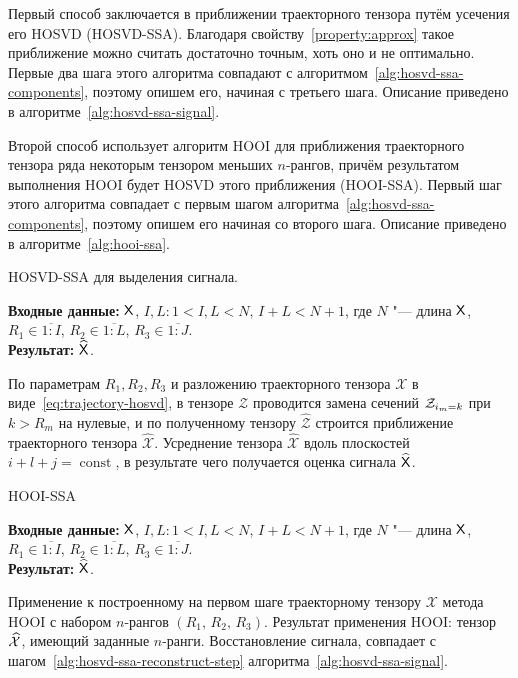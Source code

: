 \documentclass[specialist,
  substylefile=spbu.rtx,
subf,href,colorlinks=true, 12pt]{disser}
\theoremstyle{plain}
\theoremstyle{definition}
\theoremstyle{remark}
\newcommand{\Input}{\textbf{Входные данные: }}
\newcommand{\Output}{\textbf{Результат: }}
\begin{document}
Первый способ заключается в приближении траекторного тензора путём усечения его HOSVD (HOSVD-SSA).
Благодаря свойству~\ref{property:approx} такое приближение можно считать достаточно точным,
хоть оно и не оптимально.
Первые два шага этого алгоритма совпадают с алгоритмом~\ref{alg:hosvd-ssa-components}, поэтому опишем его, начиная с третьего шага.
Описание приведено в алгоритме~\ref{alg:hosvd-ssa-signal}.

Второй способ использует алгоритм HOOI для приближения траекторного тензора ряда некоторым тензором
меньших $n$-рангов, причём результатом выполнения HOOI будет HOSVD этого приближения (HOOI-SSA).
Первый шаг этого алгоритма совпадает с первым шагом алгоритма~\ref{alg:hosvd-ssa-components},
поэтому опишем его начиная со второго шага.
Описание приведено в алгоритме~\ref{alg:hooi-ssa}.

\begin{algorithm}[!ht]
  \caption{HOSVD-SSA для выделения сигнала.}
  \label{alg:hosvd-ssa-signal}
  \Input $\mathsf{X}$, $I,L: 1< I,L < N,\, I + L < N + 1$, где $N$ "--- длина $\mathsf{X}$, $R_1 \in \overline{1:I}$,
  $R_2 \in \overline{1:L}$, $R_3 \in \overline{1:J}$.\\
  \Output $\widehat{\mathsf{X}}$.

  \begin{algorithmic}[1]
    \State По параметрам $R_1, R_2, R_3$ и разложению траекторного тензора $\mathcal{X}$
    в виде~\eqref{eq:trajectory-hosvd},
    в тензоре $\mathcal{Z}$ проводится замена сечений $\mathcal{Z}_{i_m = k}$ при $k>R_m$ на нулевые,
    и по полученному тензору $\widehat{\mathcal{Z}}$
    строится приближение траекторного тензора $\widehat{\mathcal{X}}$.
    \State \label{alg:hosvd-ssa-reconstruct-step}
    Усреднение тензора $\widehat{\mathcal{X}}$ вдоль плоскостей $i+l+j=\operatorname{const}$,
    в результате чего получается оценка сигнала $\widehat{\mathsf{X}}$.
  \end{algorithmic}
\end{algorithm}

\begin{algorithm}[!ht]
  \caption{HOOI-SSA}
  \label{alg:hooi-ssa}
  \Input $\mathsf{X}$, $I,L: 1< I,L <N,\, I + L < N + 1$, где $N$ "--- длина $\mathsf{X}$, $R_1 \in \overline{1:I}$,
  $R_2 \in \overline{1:L}$, $R_3 \in \overline{1:J}$.\\
  \Output $\widehat{\mathsf{X}}$.

  \begin{algorithmic}[1]
    \State Применение к построенному на первом шаге траекторному тензору $\mathcal{X}$ метода
    HOOI с набором $n$-рангов $(R_1,\, R_2,\, R_3)$. Результат применения HOOI: тензор $\widehat{\mathcal{X}}$,
    имеющий заданные $n$-ранги.
    \State Восстановление сигнала, совпадает с шагом~\ref{alg:hosvd-ssa-reconstruct-step}
    алгоритма~\ref{alg:hosvd-ssa-signal}.
  \end{algorithmic}
\end{algorithm}
\end{document}

